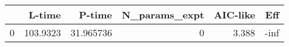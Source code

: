\begin{tabular}{lrrrrr}
\toprule
{} &    L-time &     P-time &  N\_params\_expt &  AIC-like &  Eff \\
\midrule
0 &  103.9323 &  31.965736 &              0 &     3.388 & -inf \\
\bottomrule
\end{tabular}
